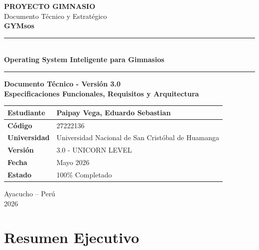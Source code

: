 \documentclass[11pt,a4paper]{article}
\begin{document}
\begin{titlepage}
\centering
\vspace*{1cm}
{\Large \textbf{PROYECTO GIMNASIO}}\\[0.4cm]
{\large Documento Técnico y Estratégico}\\[1cm]
\vspace{1cm}
{\Huge \textbf{GYMsos}}\\[0.5cm]
\rule{15cm}{0.8pt}\\[0.4cm]
{\LARGE \textbf{Operating System Inteligente para Gimnasios}}\\[0.4cm]
\rule{15cm}{0.8pt}
\vspace{2cm}
{\large \textbf{Documento Técnico - Versión 3.0}}\\[1.5cm]
{\large \textbf{Especificaciones Funcionales, Requisitos y Arquitectura}}\\[2cm]
\begin{table}[H]
\centering
\renewcommand{\arraystretch}{1.5}
\begin{tabular}{|p{5cm}|p{7cm}|}
\hline
\textbf{Estudiante} & Paipay Vega, Eduardo Sebastian \\ \hline
\textbf{Código} & 27222136 \\ \hline
\textbf{Universidad} & Universidad Nacional de San Cristóbal de Huamanga \\ \hline
\textbf{Versión} & 3.0 - UNICORN LEVEL \\ \hline
\textbf{Fecha} & Mayo 2026 \\ \hline
\textbf{Estado} & 100\% Completado \\ \hline
\end{tabular}
\end{table}
\vfill
{\large Ayacucho -- Perú}\\[0.2cm]
{\large 2026}
\end{titlepage}

\newpage
\tableofcontents
\newpage

\section*{Resumen Ejecutivo}
\end{document}
